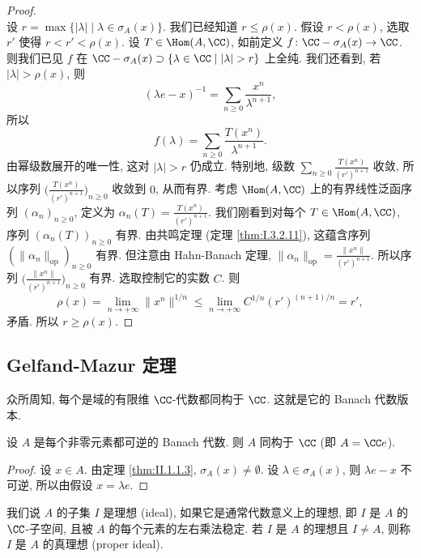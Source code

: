 \begin{proof}
\[\]
设 $r = \max\{|\lambda| \mid \lambda \in \sigma_A(x)\}$. 我们已经知道 $r \leq \rho(x)$. 假设 $r < \rho(x)$, 选取 $r'$ 使得 $r < r' < \rho(x)$. 设 $T \in \Hom(A, \CC)$, 如前定义 $f \colon \CC - \sigma_A(x) \to \CC$. 则我们已见 $f$ 在 $\CC - \sigma_A(x) \supset \{\lambda \in \CC \mid |\lambda| > r\}$ 上全纯. 我们还看到, 若 $|\lambda| > \rho(x)$, 则
\[
(\lambda e - x)^{-1} = \sum_{n \geq 0}\frac{x^n}{\lambda^{n+1}},
\]
所以
\[
f(\lambda) = \sum_{n \geq 0}\frac{T(x^n)}{\lambda^{n+1}}.
\]
由幂级数展开的唯一性, 这对 $|\lambda| > r$ 仍成立. 特别地, 级数 $\sum_{n \geq 0}\frac{T(x^n)}{(r')^{n+1}}$ 收敛, 所以序列 $\bigl(\frac{T(x^n)}{(r')^{n+1}}\bigr)_{n \geq 0}$ 收敛到 $0$, 从而有界. 考虑 $\Hom(A, \CC)$ 上的有界线性泛函序列 $(\alpha_n)_{n \geq 0}$, 定义为 $\alpha_n(T) = \frac{T(x^n)}{(r')^{n+1}}$. 我们刚看到对每个 $T \in \Hom(A, \CC)$, 序列 $(\alpha_n(T))_{n \geq 0}$ 有界. 由共鸣定理 (定理 \ref{thm:I.3.2.11}), 这蕴含序列 $(\|\alpha_n\|_{\mathrm{op}})_{n \geq 0}$ 有界. 但注意由 Hahn-Banach 定理, $\|\alpha_n\|_{\mathrm{op}} = \frac{\|x^n\|}{(r')^{n+1}}$. 所以序列 $\bigl(\frac{\|x^n\|}{(r')^{n+1}}\bigr)_{n \geq 0}$ 有界. 选取控制它的实数 $C$. 则
\[
\rho(x) = \lim_{n \to +\infty}\|x^n\|^{1/n} \leq \lim_{n \to +\infty}C^{1/n}(r')^{(n+1)/n} = r',
\]
矛盾. 所以 $r \geq \rho(x)$.
\end{proof}

\subsection{Gelfand-Mazur 定理}

众所周知, 每个是域的有限维 $\CC$-代数都同构于 $\CC$. 这就是它的 Banach 代数版本.

\begin{corollary}
\label{cor:II.1.2.1}
设 $A$ 是每个非零元素都可逆的 Banach 代数. 则 $A$ 同构于 $\CC$ (即 $A = \CC e$).
\end{corollary}

\begin{proof}
设 $x \in A$. 由定理 \ref{thm:II.1.1.3}, $\sigma_A(x) \neq \emptyset$. 设 $\lambda \in \sigma_A(x)$, 则 $\lambda e - x$ 不可逆, 所以由假设 $x = \lambda e$.
\end{proof}

\begin{definition}[理想]
\label{def:II.1.2.2}
我们说 $A$ 的子集 $I$ 是理想 (ideal), 如果它是通常代数意义上的理想, 即 $I$ 是 $A$ 的 $\CC$-子空间, 且被 $A$ 的每个元素的左右乘法稳定. 若 $I$ 是 $A$ 的理想且 $I \neq A$, 则称 $I$ 是 $A$ 的真理想 (proper ideal).
\end{definition}

